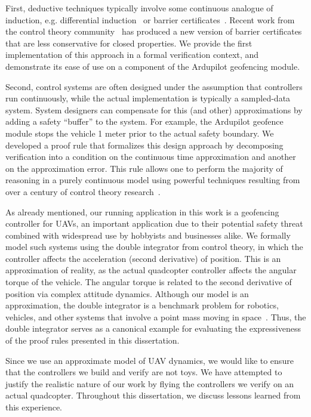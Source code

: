 \documentclass[12pt]{ucsddissertation}
\begin{document}
\begin{dissertationintroduction}
First, deductive techniques typically involve some continuous analogue of
induction, e.g. differential induction~\cite{Platzer10DAL} or barrier
certificates~\cite{prajna04barrier}. Recent work from the control theory
community~\cite{kong2013barrier,xu15barrier,nguyen16barrier} has produced a
new version of barrier certificates that are less conservative for closed
properties. We provide the first implementation of this approach in a
formal verification context, and demonstrate its ease of use on a component
of the Ardupilot geofencing module.

Second, control systems are often designed under the assumption that
controllers run continuously, while the actual implementation is typically
a sampled-data system. System designers can compensate for this (and other)
approximations by adding a safety ``buffer'' to the system. For example,
the Ardupilot geofence module stops the vehicle 1 meter prior to the actual
safety boundary. We developed a proof rule that formalizes this design
approach by decomposing verification into a condition on the continuous
time approximation and another on the approximation error.  This rule
allows one to perform the majority of reasoning in a purely continuous
model using powerful techniques resulting from over a century of control
theory research~\cite{kong2013barrier,xu15barrier,nguyen16barrier}.

As already mentioned, our running application in this work is a geofencing
controller for UAVs, an important application due to their potential safety
threat combined with widespread use by hobbyists and businesses alike. We
formally model such systems using the double integrator from control
theory, in which the controller affects the acceleration (second
derivative) of position. This is an approximation of reality, as the actual
quadcopter controller affects the angular torque of the vehicle. The
angular torque is related to the second derivative of position via complex
attitude dynamics. Although our model is an approximation, the double
integrator is a benchmark problem for robotics, vehicles, and other systems
that involve a point mass moving in space~\cite{rao2001naive}. Thus, the
double integrator serves as a canonical example for evaluating the
expressiveness of the proof rules presented in this dissertation.

Since we use an approximate model of UAV dynamics, we would like to ensure
that the controllers we build and verify are not toys. We have attempted to
justify the realistic nature of our work by flying the controllers we
verify on an actual quadcopter. Throughout this dissertation, we discuss
lessons learned from this experience.


\end{dissertationintroduction}
\end{document}
